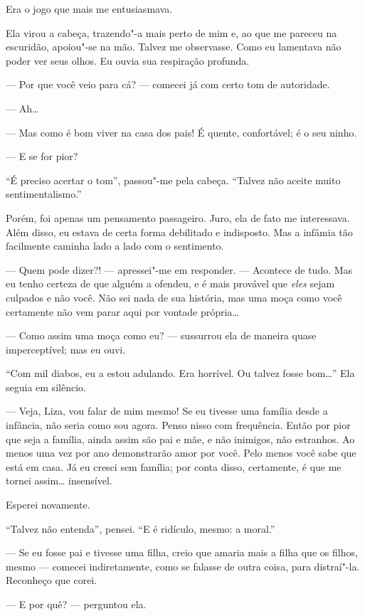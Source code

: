 Era o jogo que mais me entusiasmava.

Ela virou a cabeça, trazendo"-a mais perto de mim e, ao que me pareceu na
escuridão, apoiou"-se na mão. Talvez me observasse. Como eu lamentava
não poder ver seus olhos. Eu ouvia sua respiração profunda.

--- Por que você veio para cá? --- comecei já com certo tom de autoridade.

--- Ah\ldots{}

--- Mas como é bom viver na casa dos pais! É quente, confortável; é o seu
ninho.

--- E se for pior?

``É preciso acertar o tom'', passou"-me pela cabeça. ``Talvez não aceite
muito sentimentalismo.''

Porém, foi apenas um pensamento passageiro. Juro, ela de fato me
interessava. Além disso, eu estava de certa forma debilitado e
indisposto. Mas a infâmia tão facilmente caminha lado a lado com o
sentimento.

--- Quem pode dizer?! --- apressei{}"-me em responder. --- Acontece de tudo.
Mas eu tenho certeza de que alguém a ofendeu, e é mais provável que
\textit{eles} sejam culpados e não você. Não sei nada de sua história,
mas uma moça como você certamente não vem parar aqui por vontade
própria\ldots{}

--- Como assim uma moça como eu? --- sussurrou ela de maneira quase
imperceptível; mas eu ouvi.

``Com mil diabos, eu a estou adulando. Era horrível. Ou talvez fosse
bom\ldots{}'' Ela seguia em silêncio.

--- Veja, Liza, vou falar de mim mesmo! Se eu tivesse uma família desde a
infância, não seria como sou agora. Penso nisso com frequência. Então
por pior que seja a família, ainda assim são pai e mãe, e não inimigos,
não estranhos. Ao menos uma vez por ano demonstrarão amor por você.
Pelo menos você sabe que está em casa. Já eu cresci sem família; por
conta disso, certamente, é que me tornei assim\ldots{} insensível.

Esperei novamente.

``Talvez não entenda'', pensei. ``E é ridículo, mesmo: a moral.''

--- Se eu fosse pai e tivesse uma filha, creio que amaria mais a filha que
os filhos, mesmo --- comecei indiretamente, como se falasse de outra
coisa, para distraí"-la. Reconheço que corei.

--- E por quê? --- perguntou ela.

